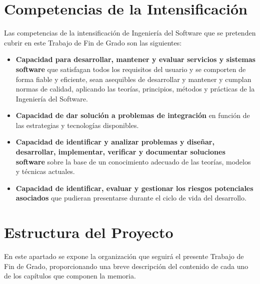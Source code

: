 \section{Competencias de la Intensificación}

Las competencias de la intensificación de Ingeniería del Software que se pretenden cubrir en este Trabajo de Fin de Grado son las siguientes:

\begin{itemize}
    \item[\textbf{IS-1}] \textbf{Capacidad para desarrollar, mantener y evaluar servicios y sistemas software} que satisfagan todos los requisitos del usuario y se comporten de forma fiable y eficiente, sean asequibles de desarrollar y mantener y cumplan normas de calidad, aplicando las teorías, principios, métodos y prácticas de la Ingeniería del Software.
    
    \item[\textbf{IS-3}] \textbf{Capacidad de dar solución a problemas de integración} en función de las estrategias y tecnologías disponibles.
    
    \item[\textbf{IS-4}] \textbf{Capacidad de identificar y analizar problemas y diseñar, desarrollar, implementar, verificar y documentar soluciones software} sobre la base de un conocimiento adecuado de las teorías, modelos y técnicas actuales.
    
    \item[\textbf{IS-5}] \textbf{Capacidad de identificar, evaluar y gestionar los riesgos potenciales asociados} que pudieran presentarse durante el ciclo de vida del desarrollo.
\end{itemize}
\section{Estructura del Proyecto}
En este apartado se expone la organización que seguirá el presente Trabajo de Fin de Grado, proporcionando una breve descripción del contenido de cada uno de los capítulos que componen la memoria.


